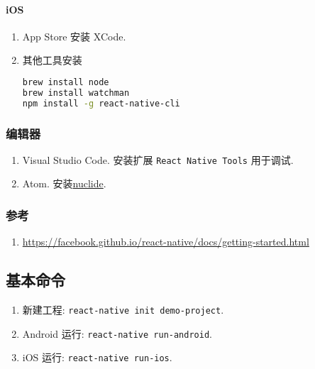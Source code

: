 \paragraph{iOS}\label{ios}

\begin{enumerate}
\def\labelenumi{\arabic{enumi}.}
\item
  App Store 安装 XCode.
\item
  其他工具安装

\begin{lstlisting}[language=bash]
brew install node
brew install watchman
npm install -g react-native-cli
\end{lstlisting}
\end{enumerate}

\subsubsection{编辑器}\label{ux7f16ux8f91ux5668}

\begin{enumerate}
\def\labelenumi{\arabic{enumi}.}
\tightlist
\item
  Visual Studio Code. 安装扩展 \lstinline!React Native Tools! 用于调试.
\item
  Atom. 安装\href{https://atom.io/packages/nuclide}{nuclide}.
\end{enumerate}

\subsubsection{参考}\label{ux53c2ux8003}

\begin{enumerate}
\def\labelenumi{\arabic{enumi}.}
\tightlist
\item
  \url{https://facebook.github.io/react-native/docs/getting-started.html}
\end{enumerate}

\subsection{基本命令}\label{ux57faux672cux547dux4ee4}

\begin{enumerate}
\def\labelenumi{\arabic{enumi}.}
\tightlist
\item
  新建工程: \lstinline!react-native init demo-project!.
\item
  Android 运行: \lstinline!react-native run-android!.
\item
  iOS 运行: \lstinline!react-native run-ios!.
\end{enumerate}

